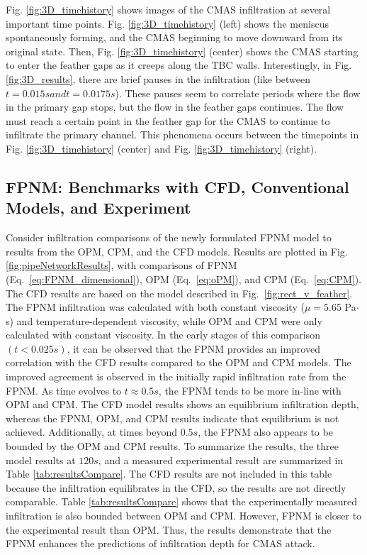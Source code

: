 \documentclass[%
 aip,
 amsmath,amssymb,
 reprint,%
]{revtex4-1}
\begin{document}
Fig. \ref{fig:3D_timehistory} shows images of the CMAS infiltration at several important time points. Fig. \ref{fig:3D_timehistory} (left) shows the meniscus spontaneously forming, and the CMAS beginning to move downward from its original state. Then, Fig. \ref{fig:3D_timehistory} (center) shows the CMAS starting to enter the feather gaps as it creeps along the TBC walls. Interestingly, in Fig. \ref{fig:3D_results}, there are brief pauses in the infiltration (like between $t=0.015 s and t=0.0175 s$). These pauses seem to correlate periods where the flow in the primary gap stops, but the flow in the feather gaps continues. The flow must reach a certain point in the feather gap for the CMAS to continue to infiltrate the primary channel. This phenomena occurs between the timepoints in Fig. \ref{fig:3D_timehistory} (center) and Fig. \ref{fig:3D_timehistory} (right).

\subsection{FPNM: Benchmarks with CFD, Conventional Models, and Experiment}
Consider infiltration comparisons of the newly formulated FPNM model to results from the OPM, CPM, and the CFD models. 
Results are plotted in Fig. \ref{fig:pipeNetworkResults}, with comparisons of FPNM (Eq.~\ref{eq:FPNM_dimensional}), OPM (Eq.~\ref{eq:oPM}), and CPM (Eq.~\ref{eq:CPM}). The CFD results are based on the model described in Fig.~\ref{fig:rect_v_feather}. 
The FPNM infiltration was calculated with both constant viscosity ($\mu = 5.65$ Pa$\cdot$s) and temperature-dependent viscosity, while OPM and CPM were only calculated with constant viscosity.
In the early stages of this comparison $(t<0.025s)$, it can be observed that the FPNM provides an improved correlation with the CFD results compared to the OPM and CPM models. The improved agreement is observed in the initially rapid infiltration rate from the FPNM. 
As time evolves to $t\approx0.5s$, the FPNM tends to be more in-line with OPM and CPM. The CFD model results shows an equilibrium infiltration depth, whereas the FPNM, OPM, and CPM results indicate that equilibrium is not achieved. 
Additionally, at times beyond $0.5s$, the FPNM also appears to be bounded by the OPM and CPM results. 
To summarize the results, the three model results at $120 s$, and a measured experimental result are summarized in Table \ref{tab:resultsCompare}. The CFD results are not included in this table because the infiltration equilibrates in the CFD, so the results are not directly comparable.
Table \ref{tab:resultsCompare} shows that the experimentally measured infiltration is also bounded between OPM and CPM.
However, FPNM is closer to the experimental result than OPM. 
Thus, the results demonstrate that the FPNM enhances the predictions of infiltration depth for CMAS attack.
\end{document}
